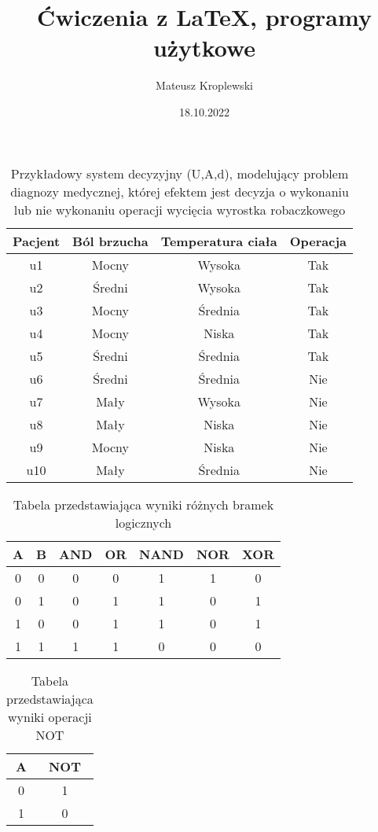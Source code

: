 \documentclass[12pt, a4paper, titlepage]{article}
\title{Ćwiczenia z LaTeX, programy użytkowe}
\author{Mateusz Kroplewski}
\date{18.10.2022}
\begin{document}
\begin{table}[h]
\centering\caption{Przykładowy system decyzyjny (U,A,d), modelujący problem diagnozy medycznej, której efektem jest decyzja o wykonaniu lub nie wykonaniu operacji wycięcia wyrostka robaczkowego\\}
\begin{tabular}{c | c c c}
	
	\hline
	\hline
	Pacjent & Ból brzucha & Temperatura ciała & Operacja\\
	\hline
	u1 & Mocny & Wysoka & Tak \\
	u2 & Średni & Wysoka & Tak \\
	u3 & Mocny & Średnia & Tak \\
	u4 & Mocny & Niska & Tak \\
	u5 & Średni & Średnia & Tak \\
	u6 & Średni & Średnia & Nie \\
	u7 & Mały & Wysoka & Nie \\
	u8 & Mały & Niska & Nie \\
	u9 & Mocny & Niska & Nie \\
	u10 & Mały & Średnia & Nie \\
	\hline
	\hline
\end{tabular}
\end{table}
\begin{table}[h]
\centering\caption{Tabela przedstawiająca wyniki różnych bramek logicznych \\}
\begin{tabular}{| c c | c c c c c |}
	\hline
	A & B & AND & OR & NAND & NOR & XOR\\
	\hline
	0 & 0 & 0 & 0 & 1 & 1 & 0 \\
	0 & 1 & 0 & 1 & 1 & 0 & 1 \\
	1 & 0 & 0 & 1 & 1 & 0 & 1 \\ 
	1 & 1 & 1 & 1 & 0 & 0 & 0 \\
	\hline
\end{tabular}
\end{table}
\begin{table}[h]

\centering\caption{Tabela przedstawiająca wyniki operacji NOT \\}
\begin{tabular}{| c | c |}
	\hline
	A & NOT\\
	\hline
	0 & 1 \\
	1 & 0 \\
	\hline
\end{tabular}
\end{table}
\end{document}
